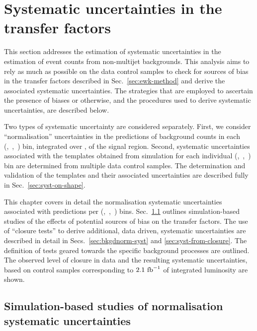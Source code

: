 \section{Systematic uncertainties in the transfer factors}
\label{sec:systematics}

This section addresses the estimation of systematic uncertainties in
the estimation of event counts from non-multijet backgrounds. This
analysis aims to rely as much as possible on the data control samples
to check for sources of bias in the transfer factors described in
Sec.~\ref{sec:ewk-method} and derive the associated systematic
uncertainties. The strategies that are employed to ascertain the
presence of biases or otherwise, and the procedures used to derive
systematic uncertainties, are described below.

Two types of systematic uncertainty are considered separately. First,
we consider ``normalisation'' uncertainties in the predictions of
background counts in each (\njet,~\nb,~\scalht) bin, integrated over
\mht, of the signal region. Second, systematic uncertainties
associated with the \mht templates obtained from simulation for each
individual (\njet,~\nb,~\scalht) bin are determined from multiple data
control samples. The determination and validation of the \mht
templates and their associated uncertainties are described fully in
Sec.~\ref{sec:syst-on-shape}.

This chapter covers in detail the normalisation systematic
uncertainties associated with predictions per (\njet,~\nb,~\scalht)
bins. Sec.~\ref{sec:mc-systematics} outlines simulation-based studies of the
effects of potential sources of bias on the transfer factors.
The use of ``closure tests'' to derive additional, data driven, systematic
uncertainties are described in detail in Secs.~\ref{sec:bkgdnorm-syst}
and \ref{sec:syst-from-closure}. The definition of tests geared
towards the specific background processes are outlined. The observed level 
of closure in data
and the resulting systematic uncertainties, based on control samples
corresponding to $2.1~\ifb$ of integrated luminosity are shown.


\subsection{Simulation-based studies of normalisation systematic uncertainties}
\label{sec:mc-systematics}

